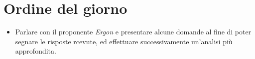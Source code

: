 \section{Ordine del giorno}

\begin{itemize}
    \item Parlare con il proponente \emph{Ergon} e presentare alcune domande al fine di poter segnare le risposte rcevute, ed effettuare successivamente un'analisi più approfondita.
\end{itemize}
